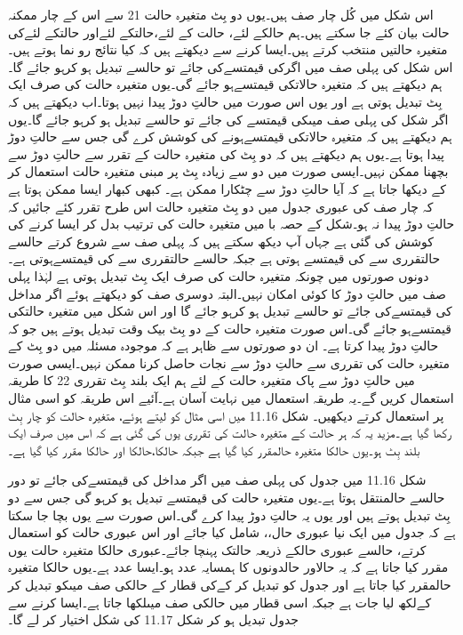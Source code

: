 	اس شکل میں کُل چار صف ہیں۔یوں دو بِٹ متغیرہ حالت 21 سے اس کے چار ممکنہ حالت بیان کئے جا سکتے ہیں۔ہم حالکے لئے، حالت کے لئے،حالتکے لئےاور حالتکے لئےکی متغیرہ حالتیں منتخب کرتے ہیں۔ایسا کرنے سے دیکھتے ہیں کہ کیا نتائج رو نما ہوتے ہیں۔
	اس شکل کی پہلی صف میں اگرکی قیمتسےکی جائے تو حالسے تبدیل ہو کرہو جائے گا۔ہم دیکھتے ہیں کہ متغیرہ حالاتکی قیمتسےہو جائے گی۔یوں متغیرہ حالت کی صرف ایک بِٹ تبدیل ہوتی ہے اور یوں اس صورت میں حالتِ دوڑ پیدا نہیں ہوتا۔اب دیکھتے ہیں کہ اگر شکل کی پہلی صف میںکی قیمتسے کی جائے تو حالسے تبدیل ہو کرہو جائے گا۔یوں ہم دیکھتے ہیں کہ متغیرہ حالاتکی قیمتسےہونے کی کوشش کرے گی جس سے حالتِ دوڑ پیدا ہوتا ہے۔یوں ہم دیکھتے ہیں کہ دو بِٹ کی متغیرہ حالت کے تقرر سے حالتِ دوڑ سے بچھنا ممکن نہیں۔ایسی صورت میں دو سے زیادہ بِٹ پر مبنی متغیرہ حالت استعمال کر کے دیکھا جاتا ہے کہ آیا حالتِ دوڑ سے چٹکارا ممکن ہے۔
	کبھی کبھار ایسا ممکن ہوتا ہے کہ چار صف کی عبوری جدول میں دو بِٹ متغیرہ حالت اس طرح تقرر کئے جائیں کہ حالتِ دوڑ پیدا نہ ہو۔شکل کے حصہ با میں متغیرہ حالت کی ترتیب بدل کر ایسا کرنے کی کوشش کی گئی ہے جہاں آپ دیکھ سکتے ہیں کہ پہلی صف سے شروع کرتے حالسے حالتقرری سے کی قیمتسے ہوتی ہے جبکہ حالسے حالتقرری سے کی قیمتسےہوتی ہے۔دونوں صورتوں میں چونکہ متغیرہ حالت کی صرف ایک بِٹ تبدیل ہوتی ہے لہٰذا پہلی صف میں حالتِ دوڑ کا کوئی امکان نہیں۔البتہ دوسری صف کو دیکھتے ہوئے اگر مداخل کی قیمتسےکی جائے تو حالسے تبدیل ہو کرہو جائے گا اور اس شکل میں متغیرہ حالتکی قیمتسےہو جائے گی۔اس صورت متغیرہ حالت کے دو بِٹ بیک وقت تبدیل ہوتے ہیں جو کہ حالتِ دوڑ پیدا کرتا ہے۔
	ان دو صورتوں سے ظاہر ہے کہ موجودہ مسئلہ میں دو بِٹ کے متغیرہ حالت کی تقرری سے حالتِ دوڑ سے نجات حاصل کرنا ممکن نہیں۔ایسی صورت میں حالتِ دوڑ سے پاک متغیرہ حالت کے لئے ہم ایک بلند بِٹ تقرری 22 کا طریقہ استعمال کریں گے۔یہ طریقہ استعمال میں نہایت آسان ہے۔آئیے اس طریقہ کو اسی مثال پر استعمال کرتے دیکھیں۔
	شکل 11.16 میں اسی مثال کو لیتے ہوئے، متغیرہ حالت کو چار بِٹ رکھا گیا ہے۔مزید یہ کہ ہر حالت کے متغیرہ حالت کی تقرری یوں کی گئی ہے کہ اس میں صرف ایک بلند بِٹ ہو۔یوں حالکا متغیرہ حالمقرر کیا گیا ہے جبکہ حالکا،حالکا  اور حالکا مقرر کیا گیا ہے۔


	شکل 11.16 میں جدول کی پہلی صف میں اگر مداخل کی قیمتسےکی جائے تو دور حالسے حالمنتقل ہوتا ہے۔یوں متغیرہ حالت کی قیمتسے تبدیل ہو کرہو گی جس سے دو بِٹ تبدیل ہوتے ہیں اور یوں یہ حالتِ دوڑ پیدا کرے گی۔اس صورت سے یوں بچا جا سکتا ہے کہ جدول میں ایک نیا عبوری حال،، شامل کیا جائے اور اس عبوری حالت کو استعمال کرتے، حالسے عبوری حالکے ذریعہ حالتک پہنچا جائے۔عبوری حالکا متغیرہ حالت یوں مقرر کیا جاتا ہے کہ یہ حالاور حالدونوں کا ہمسایہ عدد ہو۔ایسا عدد ہے۔یوں حالکا متغیرہ حالمقرر کیا جاتا ہے اور جدول کو تبدیل کر کےکی قطار کے حالکی صف میںکو تبدیل کر کےلکھ لیا جات ہے جبکہ اسی قطار میں حالکی صف میںلکھا جاتا ہے۔ایسا کرنے سے جدول تبدیل ہو کر شکل 11.17 کی شکل اختیار کر لے گا۔


